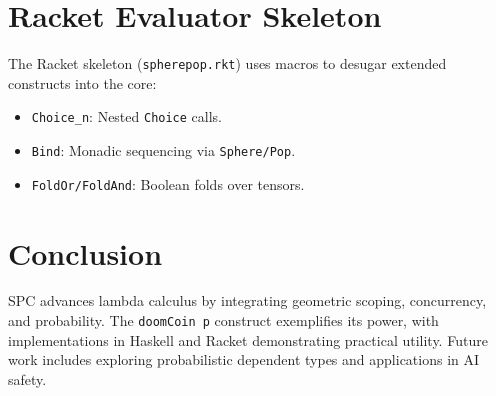 \documentclass{article}
\begin{document}
\section{Racket Evaluator Skeleton}
The Racket skeleton (\texttt{spherepop.rkt}) uses macros to desugar extended constructs into the core:
\begin{itemize}
    \item \texttt{Choice\_n}: Nested \texttt{Choice} calls.
    \item \texttt{Bind}: Monadic sequencing via \texttt{Sphere/Pop}.
    \item \texttt{FoldOr/FoldAnd}: Boolean folds over tensors.
\end{itemize}

\section{Conclusion}
SPC advances lambda calculus by integrating geometric scoping, concurrency, and probability. The \texttt{doomCoin p} construct exemplifies its power, with implementations in Haskell and Racket demonstrating practical utility. Future work includes exploring probabilistic dependent types and applications in AI safety.



\end{document}
